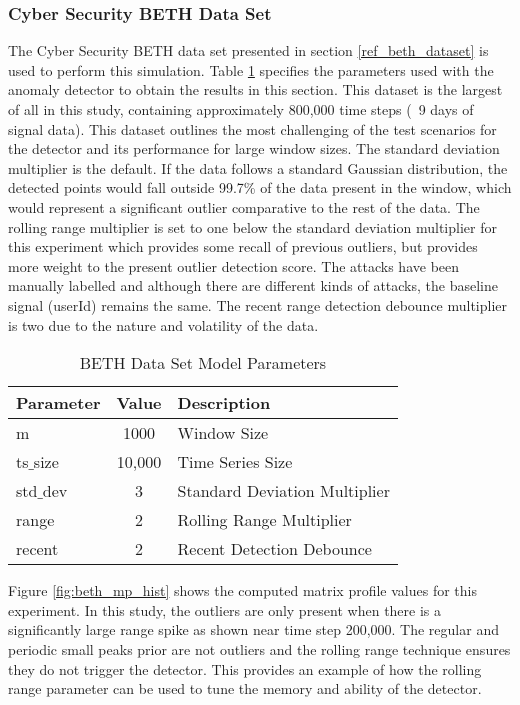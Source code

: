 \subsubsection{Cyber Security BETH Data Set}
\label{ref_results_beth_sim}
The Cyber Security BETH data set presented in section \ref{ref_beth_dataset} is used to perform this simulation. Table \ref{tab:beth_sim_params} specifies the parameters used with the anomaly detector to obtain the results in this section. This dataset is the largest of all in this study, containing approximately 800,000 time steps (~9 days of signal data). This dataset outlines the most challenging of the test scenarios for the detector and its performance for large window sizes. The standard deviation multiplier is the default. If the data follows a standard Gaussian distribution, the detected points would fall outside 99.7\% of the data present in the window, which would represent a significant outlier comparative to the rest of the data. The rolling range multiplier is set to one below the standard deviation multiplier for this experiment which provides some recall of previous outliers, but provides more weight to the present outlier detection score. The attacks have been manually labelled and although there are different kinds of attacks, the baseline signal (userId) remains the same. The recent range detection debounce multiplier is two due to the nature and volatility of the data.

\begin{table}[H]
\caption{BETH Data Set Model Parameters}
\begin{tabular}{|l|c|l|}
    \hline
	\textbf{Parameter} & \textbf{Value} & \textbf{Description} \\ \hline
	m & 1000 & Window Size \\ \hline
	ts$\_$size & 10,000 & Time Series Size \\ \hline
	std$\_$dev & 3 & Standard Deviation Multiplier \\ \hline
	range & 2 & Rolling Range Multiplier\\ \hline
	recent & 2 & Recent Detection Debounce\\ \hline
\end{tabular}
\label{tab:beth_sim_params}
\end{table}

Figure \ref{fig:beth_mp_hist} shows the computed matrix profile values for this experiment. In this study, the outliers are only present when there is a significantly large range spike as shown near time step 200,000. The regular and periodic small peaks prior are not outliers and the rolling range technique ensures they do not trigger the detector. This provides an example of how the rolling range parameter can be used to tune the memory and ability of the detector. 

